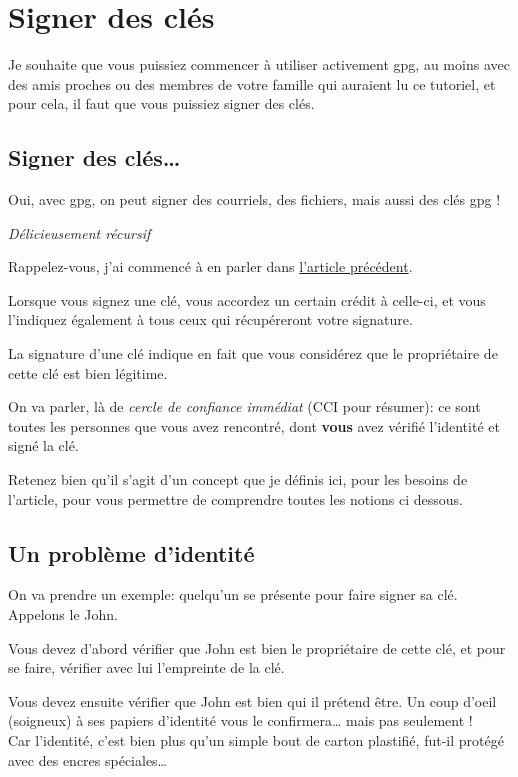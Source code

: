 \chapter{Signer des clés}

Je souhaite que vous puissiez commencer à utiliser activement gpg, au
moins avec des amis proches ou des membres de votre famille qui auraient
lu ce tutoriel, et pour cela, il faut que vous puissiez signer des clés.

\section{Signer des clés\ldots{}}\label{signer-des-cluxe9s}

Oui, avec gpg, on peut signer des courriels, des fichiers, mais aussi
des clés gpg !

\emph{Délicieusement récursif}

Rappelez-vous, j'ai commencé à en parler dans
\href{\{filename\}6-crypted-mail-fr.md}{l'article précédent}.

Lorsque vous signez une clé, vous accordez un certain crédit à celle-ci,
et vous l'indiquez également à tous ceux qui récupéreront votre
signature.

La signature d'une clé indique en fait que vous considérez que le
propriétaire de cette clé est bien légitime.

On va parler, là de \emph{cercle de confiance immédiat} (CCI pour
résumer): ce sont toutes les personnes que vous avez rencontré, dont
\textbf{vous} avez vérifié l'identité et signé la clé.

Retenez bien qu'il s'agit d'un concept que je définis ici, pour les
besoins de l'article, pour vous permettre de comprendre toutes les
notions ci dessous.

\section{Un problème d'identité}\label{un-probluxe8me-didentituxe9}

On va prendre un exemple: quelqu'un se présente pour faire signer sa
clé. Appelons le John.

Vous devez d'abord vérifier que John est bien le propriétaire de cette
clé, et pour se faire, vérifier avec lui l'empreinte de la clé.

Vous devez ensuite vérifier que John est bien qui il prétend être. Un
coup d'oeil (soigneux) à ses papiers d'identité vous le
confirmera\ldots{} mais pas seulement !\\Car l'identité, c'est bien plus
qu'un simple bout de carton plastifié, fut-il protégé avec des encres
spéciales\ldots{}

